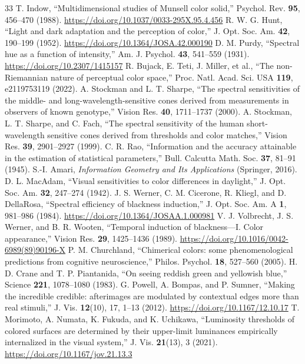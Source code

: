 \documentclass[11pt,letterpaper]{article}
\theoremstyle{plain}
\begin{document}
\begin{thebibliography}{33}
 T. Indow, ``Multidimensional studies of Munsell color solid,'' Psychol. Rev. \textbf{95}, 456--470 (1988). \url{https://doi.org/10.1037/0033-295X.95.4.456}
 R. W. G. Hunt, ``Light and dark adaptation and the perception of color,'' J. Opt. Soc. Am. \textbf{42}, 190--199 (1952). \url{https://doi.org/10.1364/JOSA.42.000190}
 D. M. Purdy, ``Spectral hue as a function of intensity,'' Am. J. Psychol. \textbf{43}, 541--559 (1931). \url{https://doi.org/10.2307/1415157}
 R. Bujack, E. Teti, J. Miller, et al., ``The non-Riemannian nature of perceptual color space,'' Proc. Natl. Acad. Sci. USA \textbf{119}, e2119753119 (2022).
 A. Stockman and L. T. Sharpe, ``The spectral sensitivities of the middle- and long-wavelength-sensitive cones derived from measurements in observers of known genotype,'' Vision Res. \textbf{40}, 1711--1737 (2000).
 A. Stockman, L. T. Sharpe, and C. Fach, ``The spectral sensitivity of the human short-wavelength sensitive cones derived from thresholds and color matches,'' Vision Res. \textbf{39}, 2901--2927 (1999).
 C. R. Rao, ``Information and the accuracy attainable in the estimation of statistical parameters,'' Bull. Calcutta Math. Soc. \textbf{37}, 81--91 (1945).
 S.-I. Amari, \emph{Information Geometry and Its Applications} (Springer, 2016).
 D. L. MacAdam, ``Visual sensitivities to color differences in daylight,'' J. Opt. Soc. Am. \textbf{32}, 247--274 (1942).
 J. S. Werner, C. M. Cicerone, R. Kliegl, and D. DellaRosa, ``Spectral efficiency of blackness induction,'' J. Opt. Soc. Am. A \textbf{1}, 981--986 (1984). \url{https://doi.org/10.1364/JOSAA.1.000981}
 V. J. Volbrecht, J. S. Werner, and B. R. Wooten, ``Temporal induction of blackness---I. Color appearance,'' Vision Res. \textbf{29}, 1425--1436 (1989). \url{https://doi.org/10.1016/0042-6989(89)90196-X}
 P. M. Churchland, ``Chimerical colors: some phenomenological predictions from cognitive neuroscience,'' Philos. Psychol. \textbf{18}, 527--560 (2005).
 H. D. Crane and T. P. Piantanida, ``On seeing reddish green and yellowish blue,'' Science \textbf{221}, 1078--1080 (1983).
 G. Powell, A. Bompas, and P. Sumner, ``Making the incredible credible: afterimages are modulated by contextual edges more than real stimuli,'' J. Vis. \textbf{12}(10), 17, 1--13 (2012). \url{https://doi.org/10.1167/12.10.17}
 T. Morimoto, A. Numata, K. Fukuda, and K. Uchikawa, ``Luminosity thresholds of colored surfaces are determined by their upper-limit luminances empirically internalized in the visual system,'' J. Vis. \textbf{21}(13), 3 (2021). \url{https://doi.org/10.1167/jov.21.13.3}

\end{thebibliography}
\end{document}
